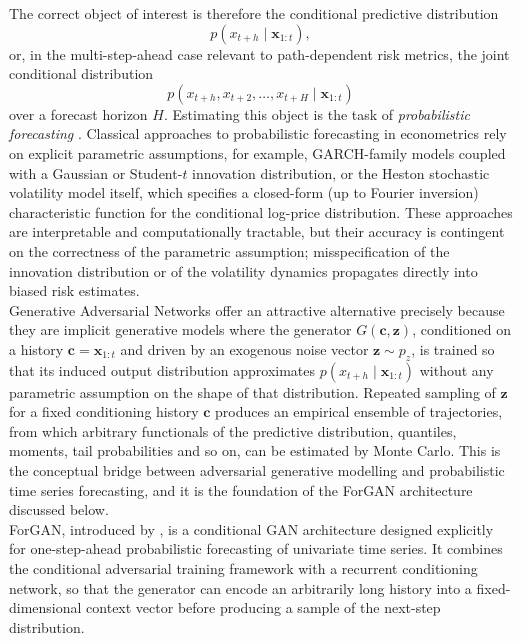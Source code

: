 The correct object of interest is therefore the conditional predictive distribution
\begin{equation}
p\left(x_{t+h} \mid \mathbf{x}_{1:t}\right),
\end{equation}
or, in the multi-step-ahead case relevant to path-dependent risk metrics, the joint conditional distribution
\begin{equation}
p\left(x_{t+h}, x_{t+2}, \dots, x_{t+H} \mid \mathbf{x}_{1:t}\right)
\end{equation}
over a forecast horizon $H$. 
Estimating this object is the task of \emph{probabilistic forecasting} \cite{background:probabilistic_forecasting}. 
Classical approaches to probabilistic forecasting in econometrics rely on explicit parametric assumptions, for example, GARCH-family models coupled with a Gaussian or Student-$t$ innovation distribution,
or the Heston stochastic volatility model itself, 
which specifies a closed-form (up to Fourier inversion) 
characteristic function for the conditional log-price distribution. 
These approaches are interpretable and computationally tractable, 
but their accuracy is contingent on the correctness of the parametric assumption; 
misspecification of the innovation distribution or of the volatility dynamics propagates directly into biased risk estimates.\\

Generative Adversarial Networks 
offer an attractive alternative precisely
because they are implicit generative models
where the generator $G(\mathbf{c}, \mathbf{z})$, conditioned on a history $\mathbf{c} = \mathbf{x}_{1:t}$ 
and driven by an exogenous noise vector $\mathbf{z} \sim p_z$, is trained so that its induced output distribution approximates $p(x_{t+h} \mid \mathbf{x}_{1:t})$
without any parametric assumption on the shape of that distribution. 
Repeated sampling of $\mathbf{z}$ for a fixed conditioning history $\mathbf{c}$ produces an empirical ensemble of trajectories, from which arbitrary functionals of the predictive distribution, quantiles, moments, tail probabilities and so on,
can be estimated by Monte Carlo. This is the conceptual bridge between adversarial generative modelling and probabilistic time series forecasting,
and it is the foundation of the ForGAN architecture discussed below.\\

ForGAN, introduced by \cite{background:forgan},
is a conditional GAN architecture designed
explicitly for one-step-ahead probabilistic
forecasting of univariate time series. 
It combines the conditional adversarial training framework
with a recurrent conditioning network, so that the generator 
can encode an arbitrarily long history into a fixed-dimensional context vector 
before producing a sample of the next-step distribution.\\

